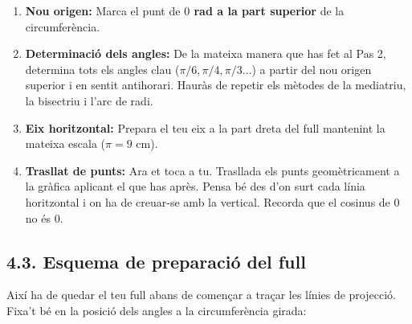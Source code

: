 \documentclass[12pt,a4paper]{article}
\begin{document}
\begin{enumerate}
    \item \textbf{Nou origen:} Marca el punt de \textbf{$0$ rad a la part superior} de la circumferència. 
    \item \textbf{Determinació dels angles:} De la mateixa manera que has fet al Pas 2, determina tots els angles clau ($\pi/6, \pi/4, \pi/3 \dots$) a partir del nou origen superior i en sentit antihorari. Hauràs de repetir els mètodes de la mediatriu, la bisectriu i l'arc de radi.
    \item \textbf{Eix horitzontal:} Prepara el teu eix a la part dreta del full mantenint la mateixa escala ($\pi = 9\text{ cm}$).
    \item \textbf{Trasllat de punts:} Ara et toca a tu. Trasllada els punts geomètricament a la gràfica aplicant el que has après. Pensa bé des d'on surt cada línia horitzontal i on ha de creuar-se amb la vertical. Recorda que el cosinus de $0$ no és $0$.
\end{enumerate}

\newpage
\subsection*{4.3. Esquema de preparació del full}

Així ha de quedar el teu full abans de començar a traçar les línies de projecció. Fixa't bé en la posició dels angles a la circumferència girada:
\end{document}
